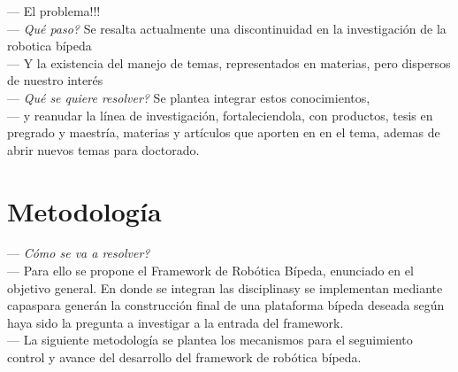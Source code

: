 \documentclass[10pt,letterpaper,oneside,onecolumn]{article}
\newcommand{\anext}{\quad[\quad$\rhd$\quad]}
\begin{document}
{  --- El problema!!!\anext\\
  --- \emph{Qu\'e paso?} Se resalta actualmente una discontinuidad en la investigaci\'on de la robotica b\'ipeda\anext\\
  --- Y la existencia del manejo de temas, representados en materias, pero dispersos de nuestro inter\'es\anext\\
  --- \emph{Qu\'e se quiere resolver?} Se plantea integrar estos conocimientos,\anext\\
  --- y reanudar la l\'inea de investigaci\'on, fortaleciendola, con productos, tesis en pregrado y maestr\'ia, materias y art\'iculos que aporten en en el tema, ademas de abrir nuevos temas para doctorado.\anext\\

  \section{Metodolog\'ia}
  \label{sec:metodologia}

  --- \emph{C\'omo se va a resolver?}\anext\\
  --- Para ello se propone el Framework de Rob\'otica B\'ipeda, enunciado en el objetivo general. En donde se integran las disciplinas\anext\quad y se implementan mediante capas\anext\quad para gener\'an la construcci\'on final de una plataforma b\'ipeda deseada seg\'un haya sido la pregunta a investigar a la entrada del framework\anext.\anext\\
  --- La siguiente metodolog\'ia se plantea los mecanismos para el seguimiento control y avance del desarrollo del framework de rob\'otica b\'ipeda.\anext\\
}
\end{document}
